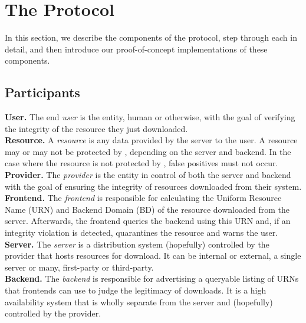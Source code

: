 \section{The \SYSTEM{} Protocol} \label{sec:approach}

In this section, we describe the components of the \SYSTEM{} protocol, step
through each in detail, and then introduce our proof-of-concept implementations
of these components.


\subsection{Participants}

\noindent\textbf{User.} The end \emph{user} is the entity, human or otherwise,
with the goal of verifying the integrity of the resource they just downloaded.
\\

\noindent\textbf{Resource.} A \emph{resource} is any data provided by the server
to the user. A resource may or may not be protected by \SYSTEM{}, depending on
the server and backend. In the case where the resource is not protected by
\SYSTEM{}, false positives must not occur. \\

\noindent\textbf{Provider.} The \emph{provider} is the entity in control of both
the server and backend with the goal of ensuring the integrity of resources
downloaded from their system. \\

\noindent\textbf{\SYSTEM{} Frontend.} The \emph{frontend} is responsible for
calculating the Uniform Resource Name (URN) and Backend Domain (BD) of the
resource downloaded from the server. Afterwards, the frontend queries the
backend using this URN and, if an integrity violation is detected, quarantines
the resource and warns the user. \\

\noindent\textbf{Server.} The \emph{server} is a distribution system (hopefully)
controlled by the provider that hosts resources for download. It can be internal
or external, a single server or many, first-party or third-party. \\

\noindent\textbf{\SYSTEM{} Backend.} The \emph{backend} is responsible for
advertising a queryable listing of URNs that \SYSTEM{} frontends can use to
judge the legitimacy of downloads. It is a high availability system that is
wholly separate from the server and (hopefully) controlled by the provider.

